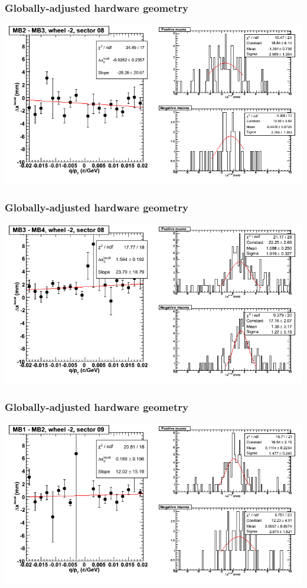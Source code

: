 \documentclass[compress]{beamer}
\begin{document}
\begin{frame}
\frametitle{Globally-adjusted hardware geometry}
\includegraphics[width=\linewidth]{NOV4_segdiffs_HW/dt13_resid_A_08_23.png}
\end{frame}

\begin{frame}
\frametitle{Globally-adjusted hardware geometry}
\includegraphics[width=\linewidth]{NOV4_segdiffs_HW/dt13_resid_A_08_34.png}
\end{frame}

\begin{frame}
\frametitle{Globally-adjusted hardware geometry}
\includegraphics[width=\linewidth]{NOV4_segdiffs_HW/dt13_resid_A_09_12.png}
\end{frame}
\end{document}
